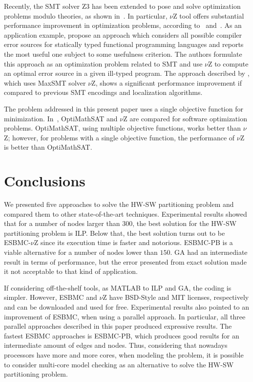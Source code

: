 \documentclass{doublecol-new}
\theoremstyle{TH}{
\newtheorem{lemma}{Lemma}
\newtheorem{theorem}[lemma]{Theorem}
\newtheorem{corrolary}[lemma]{Corrolary}
\newtheorem{conjecture}[lemma]{Conjecture}
\newtheorem{proposition}[lemma]{Proposition}
\newtheorem{claim}[lemma]{Claim}
\newtheorem{stheorem}[lemma]{Wrong Theorem}
\newtheorem{algorithm}{Algorithm}
}
\theoremstyle{THrm}{
\newtheorem{definition}{Definition}[section]
\newtheorem{question}{Question}[section]
\newtheorem{remark}{Remark}
\newtheorem{scheme}{Scheme}
}
\theoremstyle{THhit}{
\newtheorem{case}{Case}[section]
}
\begin{document}
Recently, the SMT solver Z3 has been extended to pose and solve optimization problems modulo theories, as shown in~\cite{Bjorner2015}. In particular, $\nu$Z tool offers substantial performance improvement in optimization problems, according to~\cite{Bjorner2014} and~\cite{Bjorner2015}. As an application example, \cite{Pavlinovic2015} propose an approach which considers all possible compiler error sources for statically typed functional programming languages and reports the most useful one subject to some usefulness criterion. The authors formulate this approach as an optimization problem related to SMT and use $\nu$Z to compute an optimal error source in a given ill-typed program. The approach described by \cite{Pavlinovic2015}, which uses MaxSMT solver $\nu$Z, shows a significant performance improvement if compared to previous SMT encodings and localization algorithms.

The problem addressed in this present paper uses a single objective function for minimization. In~\cite{Patrick2015}, OptiMathSAT and $\nu$Z are compared for software optimization problems. OptiMathSAT, using multiple objective functions, works better than $\nu$Z; however, for problems with a single objective function, the performance of $\nu$Z is better than OptiMathSAT.

\vspace {-4 mm}
\section{Conclusions}
\label{Conclusions}

We presented five approaches to solve the HW-SW partitioning problem and compared them to other state-of-the-art techniques. Experimental results showed that for a number of nodes larger than $300$, the best solution for the HW-SW partitioning problem is ILP. Below that, the best solution turns out to be ESBMC-$\nu$Z since its execution time is faster and notorious. ESBMC-PB is a viable alternative for a number of nodes lower than $150$. GA had an intermediate result in terms of performance, but the error presented from exact solution made it not acceptable to that kind of application. 

If considering off-the-shelf tools, as MATLAB to ILP and GA, the coding is simpler. However, ESBMC and $\nu$Z have BSD-Style and MIT licenses, respectively and can be downloaded and used for free. Experimental results also pointed to an improvement of ESBMC, when using a parallel approach. In particular, all three parallel approaches described in this paper produced expressive results. The fastest ESBMC approaches is ESBMC-PB, which produces good results for an intermediate amount of edges and nodes. Thus, considering that nowadays processors have more and more cores, when modeling the problem, it is possible to consider multi-core model checking as an alternative to solve the HW-SW partitioning problem. 
\end{document}

